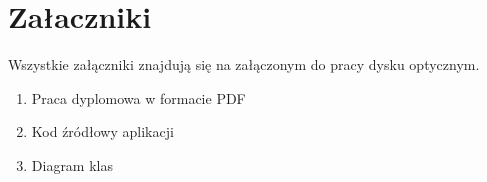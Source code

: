 \section{Załaczniki}
Wszystkie załączniki znajdują się na załączonym do pracy dysku optycznym.
\begin{enumerate}[leftmargin=*]
    \item Praca dyplomowa w formacie PDF
    \item Kod źródłowy aplikacji
    \item Diagram klas
\end{enumerate}